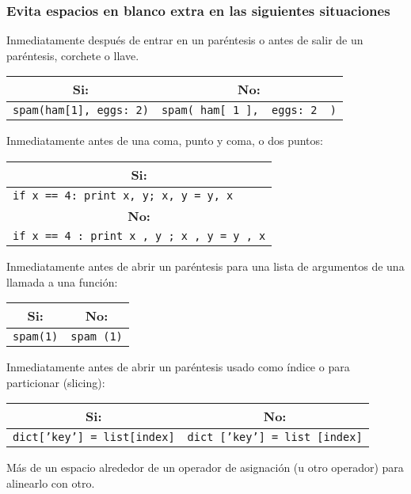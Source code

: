\subsubsection{Evita espacios en blanco extra en las siguientes situaciones}
Inmediatamente después de entrar en un paréntesis o antes de salir de un paréntesis, corchete o llave.
\begin{center}
\begin{tabular}{| l | l |}
\hline
\multicolumn{1}{|c|}{\textbf{Si:}} & \multicolumn{1}{c|}{\textbf{No:}} \\ \hline
\texttt{spam(ham[1], {eggs: 2})} & \texttt{spam( ham[ 1 ], { eggs: 2 } )} \\ \hline
\end{tabular}
\end{center}
Inmediatamente antes de una coma, punto y coma, o dos puntos:
\begin{center}
\begin{tabular}{| l |}
\hline
\multicolumn{1}{|c|}{\textbf{Si:}} \\ \hline 
\texttt{if x == 4: print x, y; x, y = y, x} \\ \hline
\multicolumn{1}{c|}{\textbf{No:}} \\ \hline
\texttt{if x == 4 : print x , y ; x , y = y , x} \\ \hline
\end{tabular}
\end{center}
Inmediatamente antes de abrir un paréntesis para una lista de argumentos de una llamada a una función:
\begin{center}
\begin{tabular}{| l | l |}
\hline
\multicolumn{1}{|c|}{\textbf{Si:}} & \multicolumn{1}{c|}{\textbf{No:}} \\ \hline
\texttt{spam(1)} & \texttt{spam (1)} \\ \hline
\end{tabular}
\end{center}
Inmediatamente antes de abrir un paréntesis usado como índice o para particionar (slicing):
\begin{center}
\begin{tabular}{| l | l |}
\hline
\multicolumn{1}{|c|}{\textbf{Si:}} & \multicolumn{1}{c|}{\textbf{No:}} \\ \hline
\texttt{dict['key'] = list[index]} & \texttt{dict ['key'] = list [index]} \\ \hline
\end{tabular}
\end{center}
Más de un espacio alrededor de un operador de asignación (u otro operador) para alinearlo con otro.
